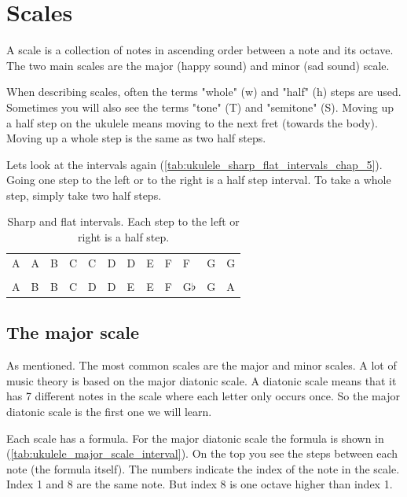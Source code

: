 \section{Scales}

A scale is a collection of notes in ascending order between a note and its octave. The two main scales are the major (happy sound) and minor (sad sound) scale.

When describing scales, often the terms "whole" (w) and "half" (h) steps are used. Sometimes you will also see the terms "tone" (T) and "semitone" (S). Moving up a half step on the ukulele means moving to the next fret (towards the body). Moving up a whole step is the same as two half steps.

Lets look at the intervals again (\autoref{tab:ukulele_sharp_flat_intervals_chap_5}). Going one step to the left or to the right is a half step interval. To take a whole step, simply take two half steps.

\begin{table}[h]
	\centering
	\begin{tabular}{*{12}{P{5mm}}}
		\large{A} & \large{A\sharp} & \large{B} & \large{C} & \large{C\sharp} & \large{D} & \large{D\sharp} & \large{E} & \large{F} & \large{F\sharp} & \large{G} & \large{G\sharp} \\ \\
		\large{A} & \large{B\flat} & \large{B} & \large{C} & \large{D\flat} & \large{D} & \large{E\flat} & \large{E} & \large{F} & \large{G$\flat$}& \large{G} & \large{A\flat}
	\end{tabular}
	\caption{Sharp and flat intervals. Each step to the left or right is a half step.}
	\label{tab:ukulele_sharp_flat_intervals_chap_5}
\end{table}

\subsection{The major scale}

As mentioned. The most common scales are the major and minor scales. A lot of music theory is based on the major diatonic scale. A diatonic scale means that it has 7 different notes in the scale where each letter only occurs once. So the major diatonic scale is the first one we will learn.

Each scale has a formula. For the major diatonic scale the formula is shown in (\autoref{tab:ukulele_major_scale_interval}). On the top you see the steps between each note (the formula itself). The numbers indicate the index of the note in the scale. Index 1 and 8 are the same note. But index 8 is one octave higher than index 1.

